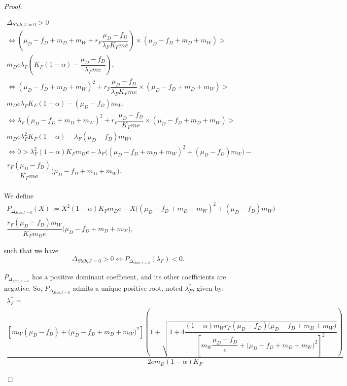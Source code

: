 \documentclass{article}
\newcommand{\lfw}{\lambda_{F}}
\newcommand{\lfw}{\lambda_{F}}
\newcommand{\cI}{\mathcal{I}}
\begin{document}
\begin{proof}
\begin{itemize}
\begin{multline*}
\Delta_{Stab, \cI = 0} > 0 \\
\Leftrightarrow \left(\mu_D - f_D + m_D + m_W + r_F \dfrac{\mu_D - f_D}{\lfw K_F m e} \right) \times   \left( \mu_D -f_D + m_D + m_W \right) > \\ m_D e \lfw \left(K_F(1-\alpha) - \dfrac{\mu_D - f_D}{\lfw m e} \right), \\
\Leftrightarrow (\mu_D - f_D + m_D + m_W)^2 + r_F \dfrac{\mu_D - f_D}{\lfw K_F m e}  \times   \left( \mu_D -f_D + m_D + m_W \right) > \\ m_D e \lfw K_F(1-\alpha) - (\mu_D - f_D)m_W , \\
\Leftrightarrow \lfw (\mu_D - f_D + m_D + m_W)^2 + r_F \dfrac{\mu_D - f_D}{K_F m e}  \times   \left( \mu_D -f_D + m_D + m_W \right) > \\ m_D e \lfw^2 K_F(1-\alpha) - \lfw (\mu_D - f_D)m_W , \\
\Leftrightarrow 0 > \lfw^2 (1-\alpha) K_F  m_D e - \lfw \Big((\mu_D - f_D + m_D + m_W)^2 +(\mu_D - f_D)m_W \Big) - \\ \dfrac{r_F (\mu_D - f_D) }{K_F m e}  \big( \mu_D -f_D + m_D + m_W \big).\\
\end{multline*}

We define 
\begin{multline*}
P_{\Delta_{Stab, \cI = 0}}(X) := X^2 (1-\alpha) K_F  m_D e - X \Big((\mu_D - f_D + m_D + m_W)^2 +(\mu_D - f_D)m_W \Big) - \\ \dfrac{r_F (\mu_D - f_D) m_W}{K_F m_D e}  \big( \mu_D -f_D + m_D + m_W \big),
\end{multline*} 

such that we have 
\begin{equation}
\Delta_{Stab, \cI = 0} > 0 \Leftrightarrow P_{\Delta_{Stab, \cI = 0}}(\lfw) < 0.
\label{equivalenceDeltaStabP}
\end{equation}

$P_{\Delta_{Stab, \cI = 0}}$ has a positive dominant coefficient, and its other coefficients are negative. So,  $P_{\Delta_{Stab, \cI = 0}}$ admits a unique positive root, noted $\lfw^*$, given by:
\begin{multline}
\lfw^* = \\
 \dfrac{\left[m_{W}(\mu_{D}-f_{D})+\big(\mu_{D}-f_{D}+m_{D}+m_{W})^{2}\right]\left(1+\sqrt{1+4\dfrac{(1-\alpha)m_{W}r_{F}\left(\mu_{D}-f_{D}\right)\big(\mu_{D}-f_{D}+m_{D}+m_{W})}{\left[m_{W}\dfrac{\mu_{D}-f_{D}}{e}+\big(\mu_{D}-f_{D}+m_{D}+m_{W})^{2}\right]^{2}}}\right)}{2em_D (1-\alpha) K_F }
\end{multline}


\end{itemize}
\end{proof}
\end{document}
